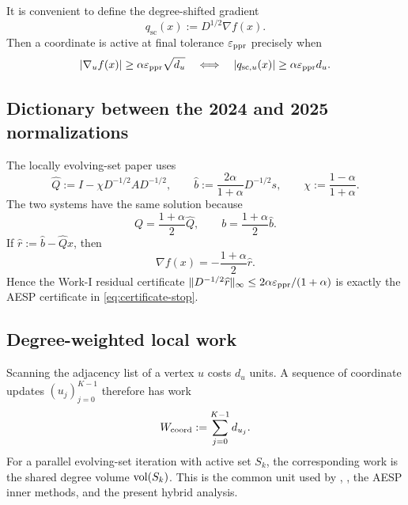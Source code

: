 It is convenient to define the degree-shifted gradient
\begin{equation}
  q_{\mathrm{sc}}(x):=D^{1/2}\nabla f(x).
  \label{eq:q-def}
\end{equation}
Then a coordinate is active at final tolerance $\varepsilon_{\mathrm{ppr}}$ precisely when
\begin{equation}
  \left\lvert \nabla_u f(x) \right\rvert\geq\alpha\varepsilon_{\mathrm{ppr}}\sqrt{d_u}
  \quad\Longleftrightarrow\quad
  \left\lvert q_{\mathrm{sc},u}(x) \right\rvert\geq\alpha\varepsilon_{\mathrm{ppr}} d_u.
  \label{eq:final-active}
\end{equation}

\subsection{Dictionary between the 2024 and 2025 normalizations}

The locally evolving-set paper uses
\begin{equation}
  \widehat Q:=I-\chi D^{-1/2}AD^{-1/2},
  \qquad
  \widehat b:=\frac{2\alpha}{1+\alpha}D^{-1/2}s,
  \qquad
  \chi:=\frac{1-\alpha}{1+\alpha}.
  \label{eq:work1-normalization}
\end{equation}
The two systems have the same solution because
\begin{equation}
  Q=\frac{1+\alpha}{2}\widehat Q,
  \qquad
  b=\frac{1+\alpha}{2}\widehat b.
  \label{eq:normalization-scale}
\end{equation}
If
$\widehat r:=\widehat b-\widehat Qx$, then
\begin{equation}
  \nabla f(x)=-\frac{1+\alpha}{2}\widehat r.
  \label{eq:gradient-residual-dictionary}
\end{equation}
Hence the Work-I residual certificate
$\lVert D^{-1/2}\widehat r\rVert_\infty\leq 2\alpha\varepsilon_{\mathrm{ppr}}/(1+\alpha)$
is exactly the AESP certificate in \cref{eq:certificate-stop}.

\subsection{Degree-weighted local work}

Scanning the adjacency list of a vertex $u$ costs $d_u$ units.  A sequence of
coordinate updates $(u_j)_{j=0}^{K-1}$ therefore has work
\begin{equation}
  W_{\rm coord}:=\sum_{j=0}^{K-1}d_{u_j}.
  \label{eq:coordinate-work}
\end{equation}
For a parallel evolving-set iteration with active set $S_k$, the corresponding
work is the shared degree volume $\operatorname{vol}(S_k)$.  This is the common unit used by
\APPR, \LOCSOR, the AESP inner methods, and the present hybrid analysis.
